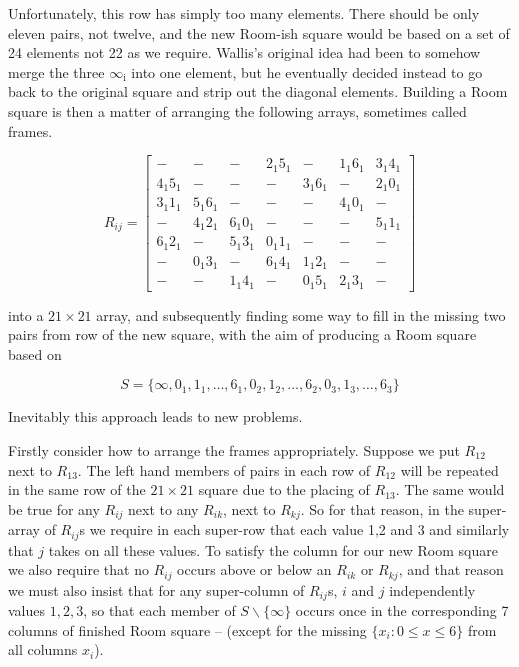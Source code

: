\begin{example}
Unfortunately, this row has simply too many elements.
There should be only eleven pairs, not twelve, and the new Room-ish square would be based on a set of 24 elements not 22 as we require.
Wallis’s original idea had been to somehow merge the three $\infty _\mathrm{i}$ into one element, but he eventually decided instead to go back to the original square and strip out the diagonal elements.
Building a Room square is then a matter of arranging the following arrays, sometimes called frames.

\begin{equation}
  R_{ij} = \begin{bmatrix}
             - &           - &           - &  2_{1}5_{1} &           - &  1_{1}6_{1} &  3_{1}4_{1} \\
    4_{1}5_{1} &           - &           - &           - &  3_{1}6_{1} &           - &  2_{1}0_{1} \\
    3_{1}1_{1} &  5_{1}6_{1} &           - &           - &           - &  4_{1}0_{1} &   - \\
             - &  4_{1}2_{1} &  6_{1}0_{1} &           - &           - &           - &  5_{1}1_{1} \\
    6_{1}2_{1} &           - &  5_{1}3_{1} &  0_{1}1_{1} &           - &           - &   - \\
             - &  0_{1}3_{1} &           - &  6_{1}4_{1} &  1_{1}2_{1} &           - &   - \\
             - &           - &  1_{1}4_{1} &           - &  0_{1}5_{1} &  2_{1}3_{1} &   - 
  \end{bmatrix}
  \label{eq:triple-room-frame}
\end{equation}

into a $21 \times 21$ array, and subsequently finding some way to fill in the missing two pairs from row of the new square, with the aim of producing a Room square based on

\begin{equation}
S = \{\infty, 0_1, 1_1, \ldots, 6_1, 0_2, 1_2, \ldots, 6_2, 0_3, 1_3, \ldots, 6_3\}
\end{equation}

Inevitably this approach leads to new problems.

Firstly consider how to arrange the frames appropriately.
Suppose we put $R_{12}$ next to $R_{13}$.
The left hand members of pairs in each row of $R_{12}$ will be repeated in the same row of the $21 \times 21$ square due to the placing of $R_{13}$.
The same would be true for any $R_{ij}$ next to any $R_{ik}$, next to $R_{kj}$.
So for that reason, in the super-array of $R_{ij}$s we require in each super-row that each value 1,2 and 3 and similarly that $j$ takes on all these values.
To satisfy the column for our new Room square we also require that no $R_{ij}$ occurs above or below an $R_{ik}$ or $R_{kj}$, and that reason we must also insist that for any super-column of $R_{ij}$s, $i$ and $j$ independently values $1, 2, 3$, so that each member of $S \backslash \{\infty\}$ occurs once in the corresponding 7 columns of finished Room square – (except for the missing $\{x_i: 0 \leq x \leq 6\}$ from all columns $x_i$).


\end{example}
